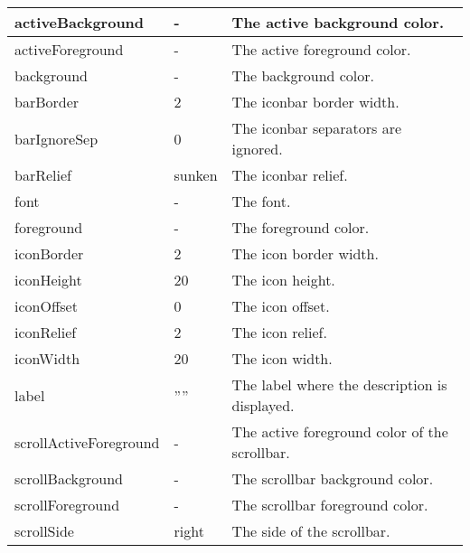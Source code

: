 {\newpage
\clearpage
\samepage \begin{supertabular}{|l|l|p{5.5cm}|}
activeBackground       & -       & The active background
                                   color.\\  \hline
activeForeground       & -       & The active foreground
                                   color.\\  \hline
background             & -       & The background color.\\  \hline
barBorder              & 2       & The iconbar border
                                   width.\\  \hline
barIgnoreSep           & 0       & The iconbar separators
                                   are ignored.\\  \hline
barRelief              & sunken  & The iconbar relief.\\  \hline
font                   & -       & The font.\\  \hline
foreground             & -       & The foreground color.\\  \hline
iconBorder             & 2       & The icon border width.\\  \hline
iconHeight             & 20      & The icon height.\\  \hline
iconOffset             & 0       & The icon offset.\\  \hline
iconRelief             & 2       & The icon relief.\\  \hline
iconWidth              & 20      & The icon width.\\  \hline
label                  & ''''    & The label where the
                                   description is
                                   displayed.\\  \hline
scrollActiveForeground & -       & The active foreground
                                   color of the scrollbar.\\  \hline
scrollBackground       & -       & The scrollbar background
                                   color.\\  \hline
scrollForeground       & -       & The scrollbar foreground
                                   color.\\  \hline
scrollSide             & right   & The side of the
                                   scrollbar.\\  \hline
\end{supertabular}
}

{\newpage
\clearpage
\samepage \begin{figure}[ht]
  \centerline{
  \epsfysize=1.2cm
  }

  \label{fig:IconBar}
\end{figure}
}

